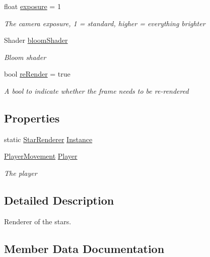 \begin{DoxyCompactItemize}
float \mbox{\hyperlink{class_star_renderer_a8b811c8bb3ed1994d130ba96a959d555}{exposure}} = 1
\begin{DoxyCompactList}\small\item\em The camera exposure, 1 = standard, higher = everything brighter \end{DoxyCompactList}\item 
Shader \mbox{\hyperlink{class_star_renderer_a3aaca55738c02aa404fac3cad14ab1dc}{bloom\+Shader}}
\begin{DoxyCompactList}\small\item\em Bloom shader \end{DoxyCompactList}\item 
bool \mbox{\hyperlink{class_star_renderer_a28014be558366230486c585403774a47}{re\+Render}} = true
\begin{DoxyCompactList}\small\item\em A bool to indicate whether the frame needs to be re-\/rendered \end{DoxyCompactList}\end{DoxyCompactItemize}
\subsection*{Properties}
\begin{DoxyCompactItemize}
\item 
static \mbox{\hyperlink{class_star_renderer}{Star\+Renderer}} \mbox{\hyperlink{class_star_renderer_ad0781969b2fc50528fbd1424adf0e624}{Instance}}
\item 
\mbox{\hyperlink{class_player_movement}{Player\+Movement}} \mbox{\hyperlink{class_star_renderer_a57a17cbf59b7a6f0d9f3ed9cd1b758f2}{Player}}
\begin{DoxyCompactList}\small\item\em The player \end{DoxyCompactList}\end{DoxyCompactItemize}


\subsection{Detailed Description}
Renderer of the stars. 



\subsection{Member Data Documentation}
\mbox{\label{class_star_renderer_a3aaca55738c02aa404fac3cad14ab1dc}} 
